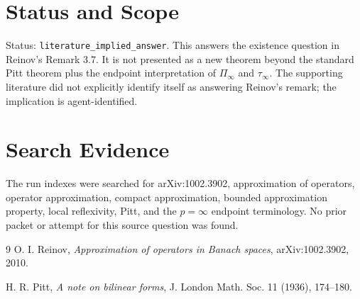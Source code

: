 \documentclass[11pt]{article}
\begin{document}
\section*{Status and Scope}

Status: \texttt{literature\_implied\_answer}. This answers the existence
question in Reinov's Remark 3.7. It is not presented as a new theorem beyond
the standard Pitt theorem plus the endpoint interpretation of
\(\Pi_\infty\) and \(\tau_\infty\). The supporting literature did not
explicitly identify itself as answering Reinov's remark; the implication is
agent-identified.

\section*{Search Evidence}

The run indexes were searched for arXiv:1002.3902, approximation of operators,
operator approximation, compact approximation, bounded approximation property,
local reflexivity, Pitt, and the \(p=\infty\) endpoint terminology. No prior
packet or attempt for this source question was found.

\begin{thebibliography}{9}
O. I. Reinov,
\emph{Approximation of operators in Banach spaces}, arXiv:1002.3902, 2010.

H. R. Pitt,
\emph{A note on bilinear forms}, J. London Math. Soc. 11 (1936), 174--180.
\end{thebibliography}
\end{document}
